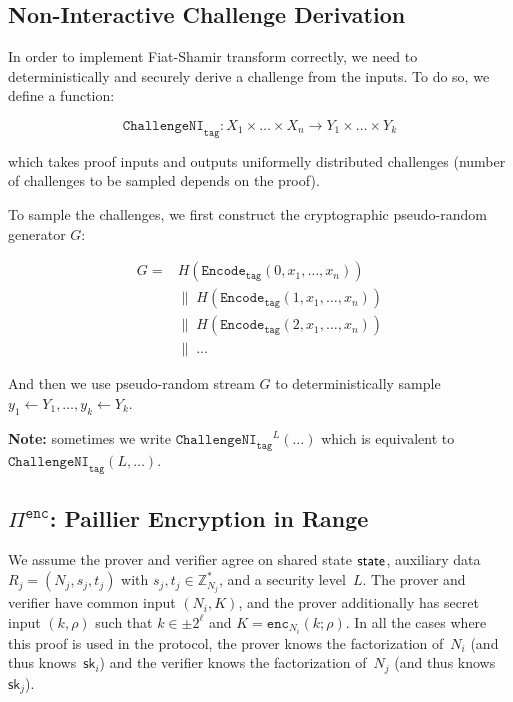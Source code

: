 \documentclass[11pt]{article}
\def\state{{\sf state}}
\newcommand{\enc}{\ensuremath{\mathtt{enc}}}
\newcommand{\proof}[1]{\ensuremath{\Pi^{\mathtt{#1}}}}
\newcommand{\challengeni}[1]{\ensuremath{\mathtt{ChallengeNI}_{\mathtt{#1}}}}
\newcommand{\Encode}[1][]{\ensuremath{\mathtt{Encode}_{\mathtt{#1}}}}
\newcommand{\sk}{\textsf{sk}}
\newcommand{\Z}{\mathbb{Z}}
\newcommand{\?}[1]{\stackrel{?}{#1}}
\begin{document}
\subsection{Non-Interactive Challenge Derivation}
In order to implement Fiat-Shamir transform correctly, we need to deterministically and securely derive a challenge
from the inputs. To do so, we define a function:

$$\challengeni{tag} : X_1 \times \dots \times X_n \to Y_1 \times \dots \times Y_k$$

which takes proof inputs and outputs uniformelly distributed challenges (number of challenges to be
sampled depends on the proof).

To sample the challenges, we first construct the cryptographic pseudo-random generator $G$:

\begin{align*}
G = & H(\Encode[tag](0, x_1, \dots, x_n)) \\
    & \| \; H(\Encode[tag](1, x_1, \dots, x_n)) \\
    & \| \; H(\Encode[tag](2, x_1, \dots, x_n)) \\
    & \| \; \dots
\end{align*}

And then we use pseudo-random stream $G$ to deterministically sample $y_1 \gets Y_1, \dots, y_k \gets Y_k$.

{\bf Note:} sometimes we write $\challengeni{tag}^L(\dots)$ which is equivalent to $\challengeni{tag}(L, \dots)$.

\subsection{$\proof{enc}$: Paillier Encryption in Range}

We assume the prover and verifier agree on shared state $\state$, auxiliary data $R_j = (N_j, s_j, t_j)$ with $s_j, t_j \in \Z^*_{N_j}$, and a security level~$L$. 
The prover and verifier have common input $(N_i, K)$, and the prover additionally has 
secret input $(k, \rho)$ such that $k \in \pm 2^\ell$ and $K = \enc_{N_i}(k; \rho)$.
In all the cases where this proof is used in the protocol, the prover knows the factorization of~$N_i$ (and thus knows~$\sk_i$) and the verifier knows the factorization of~$N_j$ (and thus knows $\sk_j$).
\end{document}
